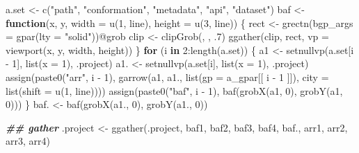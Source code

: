 \documentclass[
]{article}
\newenvironment{Shaded}{\begin{snugshade}}{\end{snugshade}}
\newcommand{\AttributeTok}[1]{\textcolor[rgb]{0.77,0.63,0.00}{#1}}
\newcommand{\ControlFlowTok}[1]{\textcolor[rgb]{0.13,0.29,0.53}{\textbf{#1}}}
\newcommand{\DecValTok}[1]{\textcolor[rgb]{0.00,0.00,0.81}{#1}}
\newcommand{\DocumentationTok}[1]{\textcolor[rgb]{0.56,0.35,0.01}{\textbf{\textit{#1}}}}
\newcommand{\FunctionTok}[1]{\textcolor[rgb]{0.00,0.00,0.00}{#1}}
\newcommand{\NormalTok}[1]{#1}
\newcommand{\OtherTok}[1]{\textcolor[rgb]{0.56,0.35,0.01}{#1}}
\newcommand{\SpecialCharTok}[1]{\textcolor[rgb]{0.00,0.00,0.00}{#1}}
\newcommand{\StringTok}[1]{\textcolor[rgb]{0.31,0.60,0.02}{#1}}
\begin{document}
\begin{Shaded}
\begin{Highlighting}[]
\NormalTok{a.set }\OtherTok{\textless{}{-}} \FunctionTok{c}\NormalTok{(}\StringTok{"path"}\NormalTok{, }\StringTok{"conformation"}\NormalTok{, }\StringTok{"metadata"}\NormalTok{, }\StringTok{"api"}\NormalTok{, }\StringTok{"dataset"}\NormalTok{)}
\NormalTok{baf }\OtherTok{\textless{}{-}} \ControlFlowTok{function}\NormalTok{(x, y, }\AttributeTok{width =} \FunctionTok{u}\NormalTok{(}\DecValTok{1}\NormalTok{, line), }\AttributeTok{height =} \FunctionTok{u}\NormalTok{(}\DecValTok{3}\NormalTok{, line)) \{}
\NormalTok{  rect }\OtherTok{\textless{}{-}} \FunctionTok{grectn}\NormalTok{(}\AttributeTok{bgp\_args =} \FunctionTok{gpar}\NormalTok{(}\AttributeTok{lty =} \StringTok{"solid"}\NormalTok{))}\SpecialCharTok{@}\NormalTok{grob}
\NormalTok{  clip }\OtherTok{\textless{}{-}} \FunctionTok{clipGrob}\NormalTok{(, , .}\DecValTok{7}\NormalTok{)}
  \FunctionTok{ggather}\NormalTok{(clip, rect, }\AttributeTok{vp =} \FunctionTok{viewport}\NormalTok{(x, y, width, height))}
\NormalTok{\}}
\ControlFlowTok{for}\NormalTok{ (i }\ControlFlowTok{in} \DecValTok{2}\SpecialCharTok{:}\FunctionTok{length}\NormalTok{(a.set)) \{}
\NormalTok{  a1 }\OtherTok{\textless{}{-}} \FunctionTok{setnullvp}\NormalTok{(a.set[i }\SpecialCharTok{{-}} \DecValTok{1}\NormalTok{], }\FunctionTok{list}\NormalTok{(}\AttributeTok{x =} \DecValTok{1}\NormalTok{), .project)}
\NormalTok{  a1. }\OtherTok{\textless{}{-}} \FunctionTok{setnullvp}\NormalTok{(a.set[i], }\FunctionTok{list}\NormalTok{(}\AttributeTok{x =} \DecValTok{1}\NormalTok{), .project)}
  \FunctionTok{assign}\NormalTok{(}\FunctionTok{paste0}\NormalTok{(}\StringTok{"arr"}\NormalTok{, i }\SpecialCharTok{{-}} \DecValTok{1}\NormalTok{),}
         \FunctionTok{garrow}\NormalTok{(a1, a1., }\FunctionTok{list}\NormalTok{(}\AttributeTok{gp =}\NormalTok{ a\_gpar[[ i }\SpecialCharTok{{-}} \DecValTok{1}\NormalTok{ ]]), }\AttributeTok{city =} \FunctionTok{list}\NormalTok{(}\AttributeTok{shift =} \FunctionTok{u}\NormalTok{(}\DecValTok{1}\NormalTok{, line))))}
  \FunctionTok{assign}\NormalTok{(}\FunctionTok{paste0}\NormalTok{(}\StringTok{"baf"}\NormalTok{, i }\SpecialCharTok{{-}} \DecValTok{1}\NormalTok{), }\FunctionTok{baf}\NormalTok{(}\FunctionTok{grobX}\NormalTok{(a1, }\DecValTok{0}\NormalTok{), }\FunctionTok{grobY}\NormalTok{(a1, }\DecValTok{0}\NormalTok{)))}
\NormalTok{\}}
\NormalTok{baf. }\OtherTok{\textless{}{-}} \FunctionTok{baf}\NormalTok{(}\FunctionTok{grobX}\NormalTok{(a1., }\DecValTok{0}\NormalTok{), }\FunctionTok{grobY}\NormalTok{(a1., }\DecValTok{0}\NormalTok{))}

\DocumentationTok{\#\# gather}
\NormalTok{.project }\OtherTok{\textless{}{-}} \FunctionTok{ggather}\NormalTok{(.project,}
\NormalTok{                    baf1, baf2, baf3, baf4, baf.,}
\NormalTok{                    arr1, arr2, arr3, arr4)}
\end{Highlighting}
\end{Shaded}
\end{document}
